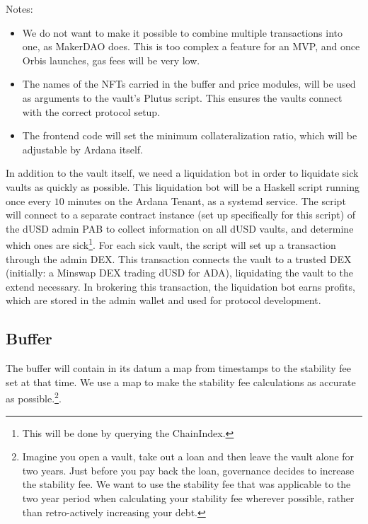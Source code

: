 \documentclass{article} %
\begin{document}
Notes:
\begin{itemize}
  \item We do not want to make it possible to combine multiple transactions into
    one, as MakerDAO does.
    This is too complex a feature for an MVP, and once Orbis launches, gas fees
    will be very low.
  \item The names of the NFTs carried in the buffer and price modules, will be
    used as arguments to the vault's Plutus script.
    This ensures the vaults connect with the correct protocol setup.
  \item The frontend code will set the minimum collateralization ratio, which
    will be adjustable by Ardana itself.
\end{itemize}

In addition to the vault itself, we need a liquidation bot in order to liquidate
sick vaults as quickly as possible.
This liquidation bot will be a Haskell script running once every $10$ minutes on
the Ardana Tenant, as a systemd service.
The script will connect to a separate contract instance (set up specifically for
this script) of the dUSD admin PAB to collect information on all dUSD vaults,
and determine which ones are sick\footnote{
  This will be done by querying the ChainIndex.
}.
For each sick vault, the script will set up a transaction through the admin DEX.
This transaction connects the vault to a trusted DEX (initially: a Minswap DEX
trading dUSD for ADA), liquidating the vault to the extend necessary.
In brokering this transaction, the liquidation bot earns profits, which are
stored in the admin wallet and used for protocol development.

\subsection{Buffer}

The buffer will contain in its datum a map from timestamps to the stability fee
set at that time.
We use a map to make the stability fee calculations as accurate as
possible.\footnote{
  Imagine you open a vault, take out a loan and then leave the vault alone for
  two years.
  Just before you pay back the loan, governance decides to increase the
  stability fee.
  We want to use the stability fee that was applicable to the two year period
  when calculating your stability fee wherever possible, rather than
  retro-actively increasing your debt.
}. \\
\end{document}

